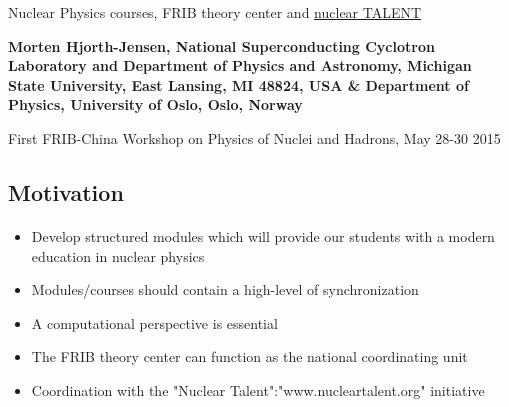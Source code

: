 \documentclass[%
twoside,                 %
final,                   %
10pt]{article}
\begin{document}






\thispagestyle{empty}

\begin{center}
{\LARGE\bf
\begin{spacing}{1.25}
Nuclear Physics courses, FRIB theory center and \href{{http://www.nucleartalent.org}}{nuclear TALENT}
\end{spacing}
}
\end{center}


\begin{center}
{\bf Morten Hjorth-Jensen, National Superconducting Cyclotron Laboratory and Department of Physics and Astronomy, Michigan State University, East Lansing, MI 48824, USA {\&} Department of Physics, University of Oslo, Oslo, Norway${}^{}$} \\ [0mm]
\end{center}

    \begin{center}
\end{center}
    

\begin{center} %
First FRIB-China Workshop on Physics of Nuclei and Hadrons, May 28-30 2015
\end{center}

\vspace{1cm}


\subsection*{Motivation}

\paragraph{}
\begin{itemize}
\item Develop structured modules which will provide our students with a modern education in nuclear physics

\item Modules/courses should contain a high-level of synchronization

\item A computational perspective is essential

\item The FRIB theory center can function as the national coordinating unit

\item Coordination with the "Nuclear Talent":"www.nucleartalent.org" initiative
\end{itemize}
\end{document}
